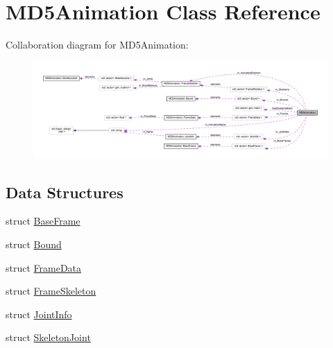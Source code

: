 \hypertarget{class_m_d5_animation}{}\section{M\+D5\+Animation Class Reference}
\label{class_m_d5_animation}


Collaboration diagram for M\+D5\+Animation\+:
\nopagebreak
\begin{figure}[H]
\begin{center}
\leavevmode
\includegraphics[width=350pt]{class_m_d5_animation__coll__graph}
\end{center}
\end{figure}
\subsection*{Data Structures}
\begin{DoxyCompactItemize}
\item 
struct \hyperlink{struct_m_d5_animation_1_1_base_frame}{Base\+Frame}
\item 
struct \hyperlink{struct_m_d5_animation_1_1_bound}{Bound}
\item 
struct \hyperlink{struct_m_d5_animation_1_1_frame_data}{Frame\+Data}
\item 
struct \hyperlink{struct_m_d5_animation_1_1_frame_skeleton}{Frame\+Skeleton}
\item 
struct \hyperlink{struct_m_d5_animation_1_1_joint_info}{Joint\+Info}
\item 
struct \hyperlink{struct_m_d5_animation_1_1_skeleton_joint}{Skeleton\+Joint}
\end{DoxyCompactItemize}
